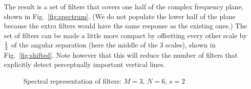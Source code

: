 \documentclass[12pt,a4]{article}
\begin{document}
The result is a set of filters that covers one half of the complex frequency plane, shown in Fig.~\ref{fig:spectrum}.  (We do not populate the lower half of the plane because the extra filters would have the same response as the existing ones.)  The set of filters can be made a little more compact by offsetting every other scale by $1\over 2$ of the angular separation (here the middle of the 3 scales), shown in Fig.~\ref{fig:shifted}.  Note however that this will reduce the number of filters that explicitly detect perceptually important vertical lines.
\begin{figure}[t]\centering
  \hspace{2em}
  \caption{Spectral representation of filters: $M=3$, $N=6$, $s=2$\label{fig:spectra}}
\end{figure}
\end{document}
